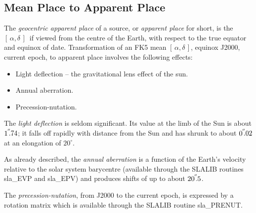 \documentclass[11pt,twoside]{article}
\newcommand{\radec}     {$[\,\alpha,\delta\,]$}
\newcommand{\arcsec}[2] {\arcseci{#1}$\hspace{-0.4em}.#2$}
\newcommand{\arcsec}[2] {
      {$#1\hspace{-0.05em}^{'\hspace{-0.1em}'}\hspace{-0.4em}.#2$}
   }
\newcommand{\arcseci}[1] {$#1\hspace{-0.05em}$\raisebox{-0.5ex}
                         {$^{'\hspace{-0.1em}'}$}}
\renewcommand{\arcseci}[1] {$#1\hspace{-0.05em}^{'\hspace{-0.1em}'}$}
\begin{document}
\subsection {Mean Place to Apparent Place}
The {\it geocentric apparent place}\/ of a source, or {\it apparent place}\/
for short,
is the \radec\ if viewed from the centre of the Earth,
with respect to the true equator and equinox of date.
Transformation of an FK5 mean \radec, equinox J2000,
current epoch, to apparent place involves the following effects:
\goodbreak
\begin{itemize}
   \item Light deflection -- the gravitational lens effect of
         the sun.
   \item Annual aberration.
   \item Precession-nutation.
\end{itemize}
The {\it light deflection}\/ is seldom significant.  Its value
at the limb of the Sun is about
\arcsec{1}{74};  it falls off rapidly with distance from the
Sun and has shrunk to about
\arcsec{0}{02} at an elongation of $20^\circ$.

As already described, the {\it annual aberration}\/
is a function of the Earth's velocity
relative to the solar system barycentre (available through the
SLALIB routines
sla\_EVP and
sla\_EPV)
and produces shifts of up to about \arcsec{20}{5}.

The {\it precession-nutation}, from J2000 to the current epoch, is
expressed by a rotation matrix which is available through the
SLALIB routine
sla\_PRENUT.
\end{document}
